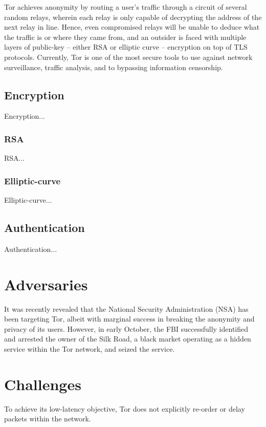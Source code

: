 \documentclass[journal]{IEEEtran}
\begin{document}
Tor achieves anonymity by routing a user's traffic through a circuit of several random relays, wherein each relay is only capable of decrypting the address of the next relay in line. Hence, even compromised relays will be unable to deduce what the traffic is or where they came from, and an outsider is faced with multiple layers of public-key -- either RSA or elliptic curve -- encryption on top of TLS protocols. Currently, Tor is one of the most secure tools to use against network surveillance, traffic analysis, and to bypassing information censorship.

\subsection{Encryption}

Encryption...

\subsubsection{RSA}

RSA...

\subsubsection{Elliptic-curve}

Elliptic-curve...

\subsection{Authentication}

Authentication...

\section{Adversaries}

It was recently revealed that the National Security Administration (NSA) has been targeting Tor, albeit with marginal success in breaking the anonymity and privacy of its users. However, in early October, the FBI successfully identified and arrested the owner of the Silk Road, a black market operating as a hidden service within the Tor network, and seized the service.

\section{Challenges}

To achieve its low-latency objective, Tor does not explicitly re-order or delay packets within the network.\cite{McCoy2008}
\end{document}

